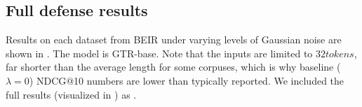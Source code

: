 \documentclass[11pt]{article}
\begin{document}



\subsection{Full defense results}
\label{app:defense-results}
Results on each dataset from BEIR under varying levels of Gaussian noise are shown in . The model is GTR-base. Note that the inputs are limited to $32 tokens$, far shorter than the average length for some corpuses, which is why baseline ($\lambda = 0$) NDCG@10 numbers are lower than typically reported. We included the full results (visualized in ) as .



\end{document}
